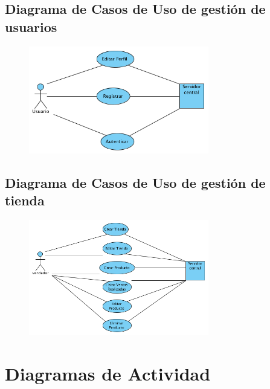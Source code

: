 \subsection{Diagrama de Casos de Uso de gestión de usuarios}

\begin{figure}[H]
  \centering
    \includegraphics[width=0.7\textwidth]{imagenes/analisis/casos-uso-usuario.png}
	\label{fig:casos-de-uso-usuario}
\end{figure}

\subsection{Diagrama de Casos de Uso de gestión de tienda}

\begin{figure}[H]
  \centering
    \includegraphics[width=0.7\textwidth]{imagenes/analisis/casos-uso-tienda.png}
    \label{fig:casos-de-uso-tienda}
\end{figure}


\section{Diagramas de Actividad}

